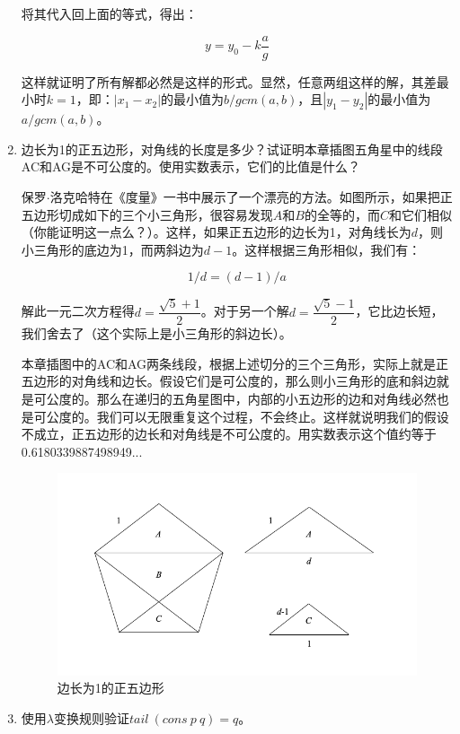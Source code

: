 \documentclass[UTF8]{article}
\begin{document}
\begin{enumerate}
将其代入回上面的等式，得出：

\[
y = y_0 - k \dfrac{a}{g}
\]

这样就证明了所有解都必然是这样的形式。显然，任意两组这样的解，其差最小时$k = 1$，即：$|x_1 - x_2|$的最小值为$b/gcm(a, b)$，且$|y_1 - y_2|$的最小值为$a/gcm(a, b)$。

\item 边长为1的正五边形，对角线的长度是多少？试证明本章插图五角星中的线段AC和AG是不可公度的。使用实数表示，它们的比值是什么？

保罗$\cdot$洛克哈特在《度量》一书中\cite{Lockhart2012}展示了一个漂亮的方法。如图所示，如果把正五边形切成如下的三个小三角形，很容易发现$A$和$B$的全等的，而$C$和它们相似（你能证明这一点么？）。这样，如果正五边形的边长为1，对角线长为$d$，则小三角形的底边为1，而两斜边为$d - 1$。这样根据三角形相似，我们有：

\[
  1 / d = (d - 1) / a
\]

解此一元二次方程得$d = \dfrac{\sqrt{5} + 1}{2}$。对于另一个解$d = \dfrac{\sqrt{5} - 1}{2}$，它比边长短，我们舍去了（这个实际上是小三角形的斜边长）。

本章插图中的AC和AG两条线段，根据上述切分的三个三角形，实际上就是正五边形的对角线和边长。假设它们是可公度的，那么则小三角形的底和斜边就是可公度的。那么在递归的五角星图中，内部的小五边形的边和对角线必然也是可公度的。我们可以无限重复这个过程，不会终止。这样就说明我们的假设不成立，正五边形的边长和对角线是不可公度的。用实数表示这个值约等于0.6180339887498949...

\begin{figure}[htbp]
 \centering
 \includegraphics[scale=0.4]{img/pentagram-unit.png}
 \captionsetup{labelformat=empty}
 \caption{边长为1的正五边形}
 \label{fig:pentagram-unit}
\end{figure}

\item 使用$\lambda$变换规则验证$tail\ (cons\ p\ q) = q$。


\end{enumerate}
\end{document}
